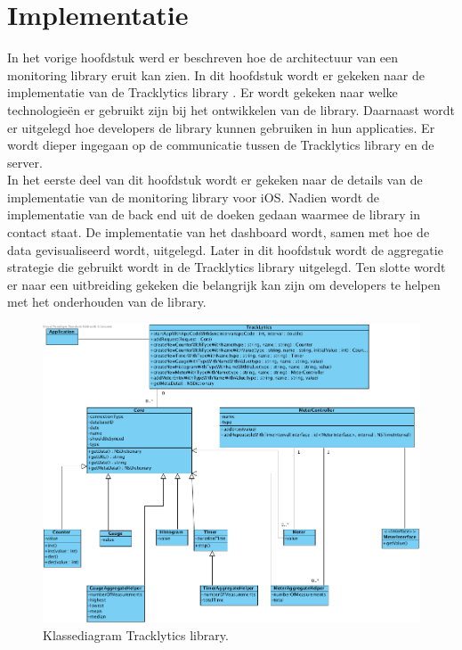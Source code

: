 \chapter{Implementatie}
In het vorige hoofdstuk werd er beschreven hoe de architectuur van een monitoring library eruit kan zien. In dit hoofdstuk wordt er gekeken naar de implementatie van de Tracklytics library \cite{Tracklytics}.
Er wordt gekeken naar welke technologie\"en er gebruikt zijn bij het ontwikkelen van de library. Daarnaast wordt er uitgelegd hoe developers de library kunnen gebruiken in hun applicaties. Er wordt dieper ingegaan op de communicatie tussen de Tracklytics library en de server. \\

In het eerste deel van dit hoofdstuk wordt er gekeken naar de details van de implementatie van de monitoring library voor iOS. Nadien wordt de implementatie van de back end uit de doeken gedaan waarmee de library in contact staat. De implementatie van het dashboard wordt, samen met hoe de data gevisualiseerd wordt, uitgelegd. Later in dit hoofdstuk wordt de aggregatie strategie die gebruikt wordt in de Tracklytics library uitgelegd. Ten slotte wordt er naar een uitbreiding gekeken die belangrijk kan zijn om developers te helpen met het onderhouden van de library. 


\begin{figure}[!h]
  \centering
  \includegraphics[scale=0.4]{Afbeeldingen/Implementatie/ClassDiagram}
  \caption{Klassediagram Tracklytics library.}
  \label{fig:fig}
\end{figure}
